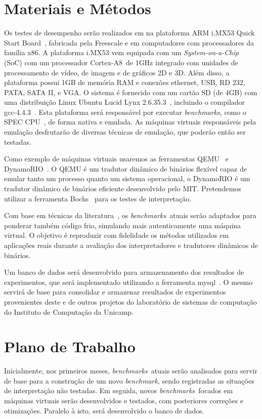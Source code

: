 \documentclass[a4paper,12pt]{article}
\newcommand{\benchmark}{\emph{benchmark}}
\newcommand{\benchmarks}{\emph{benchmarks}}
\begin{document}
\section{Materiais e Métodos}
\label{sec:mat}
Os testes de desempenho serão realizados em na plataforma ARM i.MX53 Quick Start
Board~\cite{imx53}, fabricada pela Freescale e em computadores com processadores
da família x86. A plataforma i.MX53 vem equipada com um \emph{System-on-a-Chip}
(SoC) com um processador Cortex-A8\texttrademark\ de 1GHz integrado com unidades
de processamento de vídeo, de imagem e de gráficos 2D e 3D. Além disso, a
plataforma possui 1GB de memória RAM e conexões ethernet, USB, RD 232, PATA,
SATA II, e VGA. O sistema é fornecido com um cartão SD (de 4GB) com uma
distribuição Linux Ubuntu Lucid Lynx 2.6.35.3~\cite{ubuntu}, incluindo o
compilador gcc-4.4.3~\cite{Gough_anintroduction}.  Esta plataforma será
responsável por executar \benchmarks, como o SPEC CPU~\cite{Hen00}, de forma
nativa e emulada. As máquinas virtuais responsáveis pela emulação desfrutarão de
diversas técnicas de emulação, que poderão então ser testadas.

Como exemplo de máquinas virtuais usaremos as ferramentas QEMU~\cite{qemu} e
DynamoRIO~\cite{BGA03}. O QEMU é um tradutor dinâmico de binários flexível
capaz de emular tanto um processo quanto um sistema operacional, o DynamoRIO é
um tradutor dinâmico de binários eficiente desenvolvido pelo MIT. Pretendemos
utilizar a ferramenta Bochs~\cite{boch} para os testes de interpretação.

Com base em técnicas da literatura~\cite{opt_branch,klint}, os
\benchmarks\ atuais serão adaptados para ponderar também código frio, simulando
mais autenticamente uma máquina virtual. O objetivo é reproduzir com fidelidade
os métodos utilizados em aplicações reais durante a avaliação dos
interpretadores e tradutores dinâmicos de binários.

Um banco de dados será desenvolvido para armazenamento dos resultados de
experimentos, que será implementado utilizando a ferramenta
mysql~\cite{mysql2001}.  O mesmo servirá de base para consolidar e armazenar
resultados de experimentos provenientes deste e de outros projetos do
laboratório de sistemas de computação do Instituto de Computação da Unicamp.

\section{Plano de Trabalho}
\label{sec:plano}
Inicialmente, nos primeiros meses, \benchmarks\ atuais serão analisados para
servir de base para a construção de um novo \benchmark, sendo registradas as
situações de interpretação não testadas. Em seguida, novos \benchmarks\ focados
em máquinas virtuais serão desenvolvidos e testados, com posteriores correções e
otimizações. Paralelo à isto, será desenvolvido o banco de dados.
%
\end{document}

